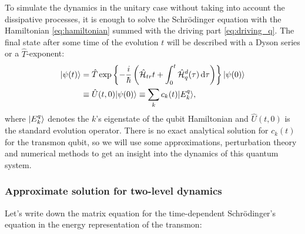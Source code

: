 To simulate the dynamics in the unitary case without taking into account the dissipative processes, it is enough to solve the Schrödinger equation with the Hamiltonian \eqref{eq:hamiltonian} summed with the driving part \eqref{eq:driving_q}. The final state after some time of the evolution $t$ will be described with a Dyson series or a $\hat T$-exponent:
\begin{equation}
\begin{aligned}
\lvert\psi (t)\rangle &= \hat T \exp\left\{-\frac{i}{\hbar} \left( \mathcal{\hat H}_{tr}t + \int_0^t \mathcal{\hat H}_q^d(\tau) \,\mathrm{d}\tau \right)\right\} \lvert\psi(0)\rangle\\
&\equiv \hat U(t, 0) \lvert\psi(0)\rangle\equiv \sum_k c_k(t) \lvert E^q_k\rangle,
\end{aligned}
\label{eq:dyson}
\end{equation} 
where $\lvert E_k^q\rangle$ denotes the $k$'s eigenstate of the qubit Hamiltonian and $\hat U(t, 0)$ is the standard evolution operator. There is no exact analytical solution for $c_k(t)$ for the transmon qubit, so we will use some approximations, perturbation theory and numerical methods to get an insight into the dynamics of this quantum system.

\subsubsection{Approximate solution for two-level dynamics} \label{sec:tr_rwa}

Let's write down the matrix equation for the time-dependent Schrödinger's equation in the energy representation of the transmon:

